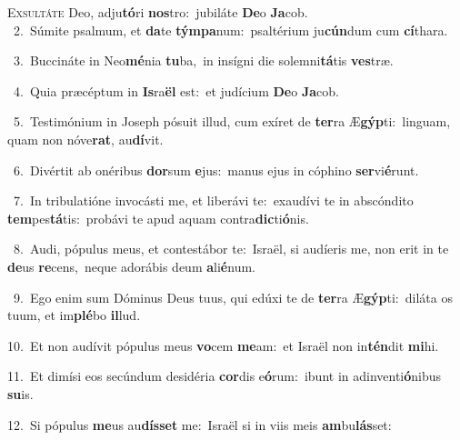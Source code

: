 \lettrine{\initial\textcolor{\initialcolor}{E}}{xsultáte} Deo, adju\-\textbf{tó}\-ri \textbf{nos}\-tro:~\star jubiláte \textbf{De}\-o \textbf{Ja}\-cob.\\
{\numbfont\textcolor{\numbcolor}{~2.}}~Súmite psalmum, et \textbf{da}\-te \textbf{tým}\-\textbf{pa}num:~\star psaltérium ju\-\textbf{cún}\-dum cum \textbf{cí}\-thara.\par
{\numbfont\textcolor{\numbcolor}{~3.}}~Buccináte in Neo\-\textbf{mé}\-nia \textbf{tu}\-ba,~\star in insígni die solemni\-\textbf{tá}\-tis \textbf{ves}\-træ.\par
{\numbfont\textcolor{\numbcolor}{~4.}}~Quia præcéptum in \textbf{Is}\-ra\textbf{ël} est:~\star et judícium \textbf{De}\-o \textbf{Ja}\-cob.\par
{\numbfont\textcolor{\numbcolor}{~5.}}~Testimónium in Joseph pósuit illud, cum exíret de \textbf{ter}\-ra Æ\-\textbf{gýp}\-ti:~\star linguam, quam non nóve\-\textbf{rat}\-, au\-\textbf{dí}\-vit.\par
{\numbfont\textcolor{\numbcolor}{~6.}}~Divértit ab onéribus \textbf{dor}\-sum \textbf{e}\-jus:~\star manus ejus in cóphino \textbf{ser}\-vi\-\textbf{é}\-runt.\par
{\numbfont\textcolor{\numbcolor}{~7.}}~In tribulatióne invocásti me, et liberávi te:~\dagger exaudívi te in abscóndito \textbf{tem}\-pes\-\textbf{tá}\-tis:~\star probávi te apud aquam contra\-\textbf{dic}\-ti\-\textbf{ó}\-nis.\par
{\numbfont\textcolor{\numbcolor}{~8.}}~Audi, pópulus meus, et contestábor te:~\dagger Israël, si audíeris me, non erit in te \textbf{de}\-us \textbf{re}\-cens,~\star neque adorábis deum \textbf{a}\-li\-\textbf{é}\-num.\par
{\numbfont\textcolor{\numbcolor}{~9.}}~Ego enim sum Dóminus Deus tuus, qui edúxi te de \textbf{ter}\-ra Æ\-\textbf{gýp}\-ti:~\star diláta os tuum, et im\-\textbf{plé}\-bo \textbf{il}\-lud.\par
{\numbfont\textcolor{\numbcolor}{10.}}~Et non audívit pópulus meus \textbf{vo}\-cem \textbf{me}\-am:~\star et Israël non in\-\textbf{tén}\-dit \textbf{mi}\-hi.\par
{\numbfont\textcolor{\numbcolor}{11.}}~Et dimísi eos secúndum desidéria \textbf{cor}\-dis e\-\textbf{ó}\-rum:~\star ibunt in adinventi\-\textbf{ó}\-nibus \textbf{su}\-is.\par
{\numbfont\textcolor{\numbcolor}{12.}}~Si pópulus \textbf{me}\-us au\-\textbf{dís}\-\textbf{set} me:~\star Israël si in viis meis \textbf{am}\-bu\-\textbf{lás}\-set:\par

